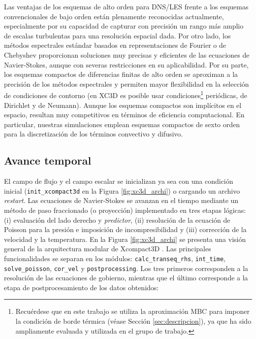 Las ventajas de los esquemas de alto orden para DNS/LES frente a los esquemas \linebreak convencionales de bajo orden están plenamente reconocidas actualmente, especialmente por su capacidad de capturar con precisión un rango más amplio de escalas turbulentas para una resolución espacial dada. Por otro lado, los métodos espectrales estándar basados en representaciones de Fourier o de Chebyshev proporcionan soluciones muy precisas y eficientes de las ecuaciones de Navier-Stokes, aunque con severas restricciones en su aplicabilidad. Por su parte, los esquemas compactos de diferencias finitas de alto orden \cite{laizet2009high} se aproximan a la precisión de los métodos espectrales y permiten mayor flexibilidad en la selección de condiciones de contorno (en XC3D es posible usar condiciones\footnote{Recuérdese que en este trabajo se utiliza la aproximación MBC para imponer la condición de borde térmica (véase Sección \ref{sec:descripcion}), ya que ha sido ampliamente evaluada y utilizada en el grupo de trabajo.} periódicas, de Dirichlet y de Neumann). Aunque los esquemas compactos son implícitos en el espacio, resultan muy competitivos en términos de eficiencia computacional. En particular, nuestras simulaciones emplean esquemas compactos de sexto orden para la discretización de los términos convectivo y difusivo.

\subsection{Avance temporal} \label{sec:time-ava}

El campo de flujo y el campo escalar se inicializan ya sea con una condición inicial (\texttt{init\_xcompact3d} en la Figura \ref{fig:xc3d_archi}) o cargando un archivo \textit{restart}. Las ecuaciones de Navier-Stokes se avanzan en el tiempo mediante un método de paso fraccionado (o proyección) implementado en tres etapas lógicas: (i) evaluación del lado derecho y \textit{predictor}, (ii) resolución de la ecuación de Poisson para la presión  e imposición de incompresibilidad y (iii) corrección \linebreak  de la velocidad y la temperatura.  En la Figura \ref{fig:xc3d_archi} se presenta una visión general de la arquitectura modular de Xcompact3D \cite{bartholomew2020xcompact3d}. Las principales funcionalidades se separan en los módulos: \texttt{calc\_transeq\_rhs}, \texttt{int\_time}, \texttt{solve\_poisson}, \texttt{cor\_vel} y \texttt{postprocessing}. Los tres primeros corresponden a la resolución de las ecuaciones de gobierno, mientras que el último corresponde a la etapa de postprocesamiento de los datos obtenidos:


